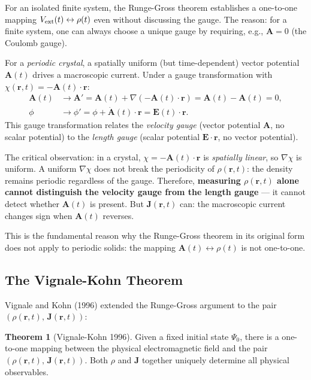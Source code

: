 \documentclass[12pt,letterpaper]{article}
\theoremstyle{definition}
\newtheorem{theorem}{Theorem}
\begin{document}
For an isolated finite system, the Runge-Gross theorem establishes a
one-to-one mapping $V_{\rm ext}(t)\leftrightarrow\rho(t)$ even without
discussing the gauge.  The reason: for a finite system, one can always
choose a unique gauge by requiring, e.g., $\bm{A}=0$ (the Coulomb gauge).

For a \emph{periodic crystal}, a spatially uniform (but time-dependent)
vector potential $\bm{A}(t)$ drives a macroscopic current.  Under a gauge
transformation with $\chi(\bm{r},t) = -\bm{A}(t)\cdot\bm{r}$:
\begin{align}
  \bm{A}(t) &\to \bm{A}' = \bm{A}(t) + \nabla(-\bm{A}(t)\cdot\bm{r})
              = \bm{A}(t) - \bm{A}(t) = 0, \\
  \phi &\to \phi' = \phi + \dot{\bm{A}}(t)\cdot\bm{r} = \bm{E}(t)\cdot\bm{r}.
\end{align}
This gauge transformation relates the \emph{velocity gauge}
(vector potential $\bm{A}$, no scalar potential) to the \emph{length gauge}
(scalar potential $\bm{E}\cdot\bm{r}$, no vector potential).

The critical observation: in a crystal, $\chi = -\bm{A}(t)\cdot\bm{r}$ is
\emph{spatially linear}, so $\nabla\chi$ is uniform.
A uniform $\nabla\chi$ does not break the periodicity of $\rho(\bm{r},t)$:
the density remains periodic regardless of the gauge.
Therefore, \textbf{measuring $\rho(\bm{r},t)$ alone cannot distinguish the
velocity gauge from the length gauge} --- it cannot detect whether $\bm{A}(t)$
is present.  But $\bm{J}(\bm{r},t)$ can: the macroscopic current changes
sign when $\bm{A}(t)$ reverses.

This is the fundamental reason why the Runge-Gross theorem in its original
form does not apply to periodic solids: the mapping
$\bm{A}(t)\leftrightarrow\rho(t)$ is not one-to-one.

\subsection{The Vignale-Kohn Theorem}

Vignale and Kohn (1996) extended the Runge-Gross argument to the pair
$(\rho(\bm{r},t),\,\bm{J}(\bm{r},t))$:

\begin{theorem}[Vignale-Kohn 1996]
Given a fixed initial state $\Psi_0$, there is a one-to-one mapping
between the physical electromagnetic field and the pair
$(\rho(\bm{r},t),\,\bm{J}(\bm{r},t))$.  Both $\rho$ and $\bm{J}$ together
uniquely determine all physical observables.
\end{theorem}
\end{document}
